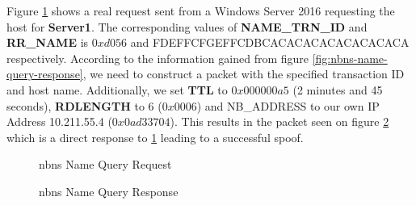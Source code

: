 \documentclass{article}
\begin{document}
Figure \ref{fig:nbns-request} shows a real request sent from a Windows Server 2016 requesting the host for \textbf{Server1}. The corresponding values of \textbf{NAME\_TRN\_ID} and \textbf{RR\_NAME} is $0xd056$ and FDEFFCFGEFFCDBCACACACACACACACACA respectively. According to the information gained from figure \ref{fig:nbns-name-query-response}, we need to construct a packet with the specified transaction ID and host name. Additionally, we set \textbf{TTL} to $0x000000a5$ (2 minutes and 45 seconds), \textbf{RDLENGTH} to 6 ($0x0006$) and NB\_ADDRESS to our own IP Address 10.211.55.4 ($0x0ad33704$). This results in the packet seen on figure \ref{fig:nbns-response} which is a direct response to \ref{fig:nbns-request} leading to a successful spoof.

\begin{figure}[H]
	\scriptsize
	\par
	\centering
	\varwidth{\linewidth}
	
	\endvarwidth
	\par

	\caption{\gls{nbns} Name Query Request}
	\label{fig:nbns-request}
\end{figure}

\begin{figure}[H]
	\scriptsize
	\par
	\centering
	\varwidth{\linewidth}
	
	\endvarwidth
	\par

	\caption{\gls{nbns} Name Query Response}
	\label{fig:nbns-response}
\end{figure}
\end{document}
